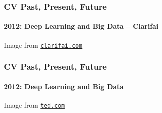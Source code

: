 \documentclass[xetex,professionalfont]{beamer}
\begin{document}
\begin{frame}
\frametitle{CV Past, Present, Future}
\framesubtitle{2012: Deep Learning and Big Data -- Clarifai}


\bigskip
\begin{center}
    {\centering Image from \href{http://www.clarifai.com}{\texttt{clarifai.com}}}
\end{center}

\end{frame}


\begin{frame}
\frametitle{CV Past, Present, Future}
\framesubtitle{2012: Deep Learning and Big Data}


\bigskip
\begin{center}
    {\centering Image from \href{https://www.ted.com/talks/fei_fei_li_how_we_re_teaching_computers_to_understand_pictures}{\texttt{ted.com}}}
\end{center}

\end{frame}

\end{document}
